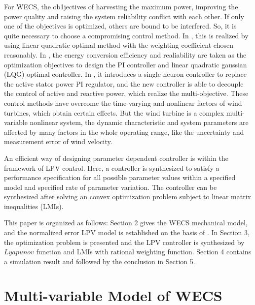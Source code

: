 \documentclass[english]{cccconf}
\begin{document}
For WECS, the ob1jectives of harvesting the maximum power, improving the
power quality and raising the system reliability conflict with each
other. If only one of the objectives is optimized, others are bound to
be interfered. So, it is quite necessary to choose a compromising control
method. In \cite{lit:1,lit:2}, this is realized by using linear
quadratic optimal method with the weighting coefficient chosen reasonably.
In \cite{lit:3,lit:4}, the energy conversion efficiency and
realiability are taken as the optimization objectives to design the PI controller
and linear quadratic gaussian (LQG) optimal controller. In \cite{lit:5}, it introduces
a single neuron controller to replace the active stator power PI regulator,
and the new controller is able to decouple the control of active and reactive
power, which realize the multi-objective. These control methods have overcome
the time-varying and nonlinear factors of wind turbines, which obtain
certain effects. But the wind turbine is a complex multi-variable nonlinear
system, the dynamic characteristic and system parameters are affected by
many factors in the whole operating range, like the uncertainty and measurement
error of wind velocity.

An efficient way of designing parameter dependent controller is within the
framework of LPV control. Here, a controller is synthesized to satisfy a
performance specification for all possible parameter values within a specified
model and specified rate of parameter variation. The controller can be
synthesized after solving an convex optimization problem subject to linear
matrix inequalities (LMIs).

This paper is organized as follows: Section 2 gives the WECS mechanical
model, and the normalized error LPV model is established on the basis of
\cite{lit:5,lit:6}. In Section 3, the optimization problem is presented and
the LPV controller is synthesized by $ Lyapunov $ function and LMIs with
rational weighting function. Section 4 contains a simulation result and followed
by the conclusion in Section 5.

\section{Multi-variable Model of WECS}
\end{document}
